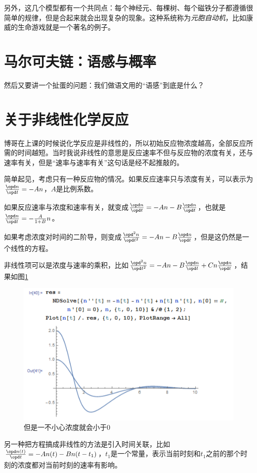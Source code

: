 另外，这几个模型都有一个共同点：每个神经元、每棵树、每个磁铁分子都遵循很简单的规律，但是合起来就会出现复杂的现象。这种系统称为\emph{元胞自动机}，比如康威的生命游戏就是一个著名的例子。
\section{马尔可夫链：语感与概率}
然后又要讲一个扯蛋的问题：我们做语文用的“语感”到底是什么？
\section{关于非线性化学反应}
博哥在上课的时候说化学反应是非线性的，所以初始反应物浓度越高，全部反应所需的时间越短。当时我说非线性的意思是反应速率不但与反应物的浓度有关，还与速率有关，但是“速率与速率有关”这句话是经不起推敲的。

简单起见，考虑只有一种反应物的情况。如果反应速率只与浓度有关，可以表示为$\frac{\opd n}{\opd t}=-A n$，$A$是比例系数。

如果反应速率与浓度和速率有关，就变成$\frac{\opd n}{\opd t}=-A n-B \frac{\opd n}{\opd t}$，也就是$\frac{\opd n}{\opd t}=-\frac{A}{1+B} n$。

如果考虑浓度对时间的二阶导，则变成$\frac{\opd^2 n}{\opd t^2}=-A n-B \frac{\opd n}{\opd t}$，但是这仍然是一个线性的方程。

非线性项可以是浓度与速率的乘积，比如$\frac{\opd^2 n}{\opd t^2}=-A n-B \frac{\opd n}{\opd t}+C n \frac{\opd n}{\opd t}$，结果如图\ref{fig-nonlinear-reaction}
\begin{figure}[htb]
\centering
\includegraphics[width=0.33\linewidth]{fig/nonlinear-reaction.png}
\caption{但是一不小心浓度就会小于0}
\label{fig-nonlinear-reaction}
\end{figure}

另一种把方程搞成非线性的方法是引入时间关联，比如$\frac{\opd n(t)}{\opd t}=-A n(t)-B n(t-t_1)$，$t_1$是一个常量，表示当前时刻和$t_1$之前的那个时刻的浓度都对当前时刻的速率有影响。

